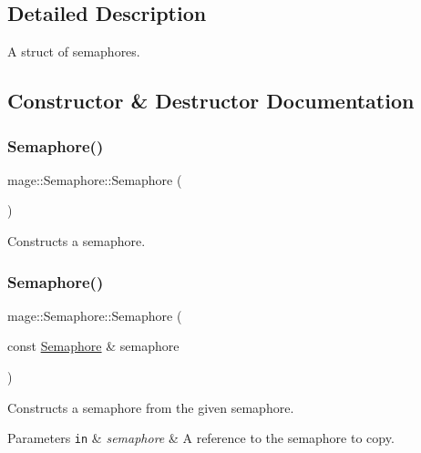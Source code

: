 \subsection{Detailed Description}
A struct of semaphores. 

\subsection{Constructor \& Destructor Documentation}
\hypertarget{structmage_1_1_semaphore_a3733a67071b832a57ec086d52b28fd84}{}\label{structmage_1_1_semaphore_a3733a67071b832a57ec086d52b28fd84} 
\subsubsection{\texorpdfstring{Semaphore()}{Semaphore()}\hspace{0.1cm}{\footnotesize\ttfamily [1/3]}}
{\footnotesize\ttfamily mage\+::\+Semaphore\+::\+Semaphore (\begin{DoxyParamCaption}{ }\end{DoxyParamCaption})\hspace{0.3cm}{\ttfamily [noexcept]}}

Constructs a semaphore. \hypertarget{structmage_1_1_semaphore_a8873b2ed82ff66d323a8c3cebf0fb5c0}{}\label{structmage_1_1_semaphore_a8873b2ed82ff66d323a8c3cebf0fb5c0} 
\subsubsection{\texorpdfstring{Semaphore()}{Semaphore()}\hspace{0.1cm}{\footnotesize\ttfamily [2/3]}}
{\footnotesize\ttfamily mage\+::\+Semaphore\+::\+Semaphore (\begin{DoxyParamCaption}\item[{const \hyperlink{structmage_1_1_semaphore}{Semaphore} \&}]{semaphore }\end{DoxyParamCaption})\hspace{0.3cm}{\ttfamily [delete]}}

Constructs a semaphore from the given semaphore.


\begin{DoxyParams}[1]{Parameters}
\mbox{\tt in}  & {\em semaphore} & A reference to the semaphore to copy. \\
\hline
\end{DoxyParams}
\hypertarget{structmage_1_1_semaphore_abe3e33b06c3cb3cbfe3fa041ef80434f}{}\label{structmage_1_1_semaphore_abe3e33b06c3cb3cbfe3fa041ef80434f} 
